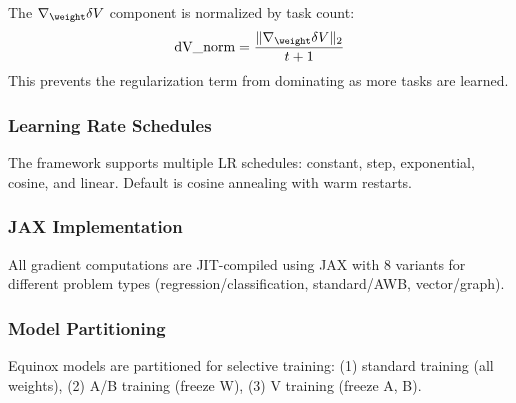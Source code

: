 The $\nabla_{\weight} \delta V$ component is normalized by task count:
\begin{equation}
    \text{dV\_norm} = \frac{\|\nabla_{\weight} \delta V\|_2}{t + 1}
\end{equation}
This prevents the regularization term from dominating as more tasks are learned.

\subsubsection{Learning Rate Schedules}

The framework supports multiple LR schedules: constant, step, exponential, cosine, and linear. Default is cosine annealing with warm restarts.

\subsubsection{JAX Implementation}

All gradient computations are JIT-compiled using JAX with 8 variants for different problem types (regression/classification, standard/AWB, vector/graph).

\subsubsection{Model Partitioning}

Equinox models are partitioned for selective training: (1) standard training (all weights), (2) A/B training (freeze W), (3) V training (freeze A, B).
